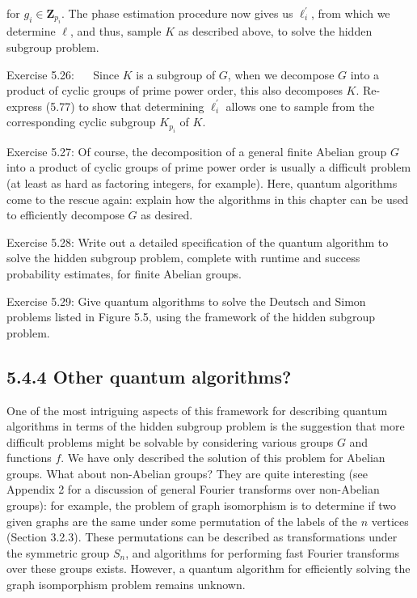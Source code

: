 for $g_{i} \in \mathbf{Z}_{p_{i}}$. The phase estimation procedure now gives us $\ell_{i}^{\prime}$, from which we determine $\ell$, and thus, sample $K$ as described above, to solve the hidden subgroup problem.

Exercise 5.26: $\quad$ Since $K$ is a subgroup of $G$, when we decompose $G$ into a product of cyclic groups of prime power order, this also decomposes $K$. Re-express (5.77) to show that determining $\ell_{i}^{\prime}$ allows one to sample from the corresponding cyclic subgroup $K_{p_{i}}$ of $K$.

Exercise 5.27: Of course, the decomposition of a general finite Abelian group $G$ into a product of cyclic groups of prime power order is usually a difficult problem (at least as hard as factoring integers, for example). Here, quantum algorithms come to the rescue again: explain how the algorithms in this chapter can be used to efficiently decompose $G$ as desired.

Exercise 5.28: Write out a detailed specification of the quantum algorithm to solve the hidden subgroup problem, complete with runtime and success probability estimates, for finite Abelian groups.

Exercise 5.29: Give quantum algorithms to solve the Deutsch and Simon problems listed in Figure 5.5, using the framework of the hidden subgroup problem.

\subsection*{5.4.4 Other quantum algorithms?}
One of the most intriguing aspects of this framework for describing quantum algorithms in terms of the hidden subgroup problem is the suggestion that more difficult problems might be solvable by considering various groups $G$ and functions $f$. We have only described the solution of this problem for Abelian groups. What about non-Abelian groups? They are quite interesting (see Appendix 2 for a discussion of general Fourier transforms over non-Abelian groups): for example, the problem of graph isomorphism is to determine if two given graphs are the same under some permutation of the labels of the $n$ vertices (Section 3.2.3). These permutations can be described as transformations under the symmetric group $S_{n}$, and algorithms for performing fast Fourier transforms\\
over these groups exists. However, a quantum algorithm for efficiently solving the graph isomporphism problem remains unknown.

